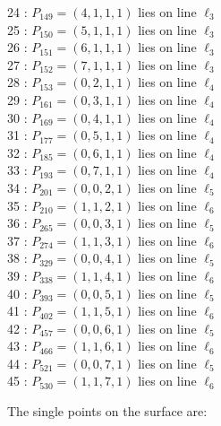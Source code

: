 \documentclass{article}
\begin{document}
{\begin{multicols}{2}
24 : $P_{149}=( 4, 1, 1, 1 )$ lies on line $\ell_{3}$\\
25 : $P_{150}=( 5, 1, 1, 1 )$ lies on line $\ell_{3}$\\
26 : $P_{151}=( 6, 1, 1, 1 )$ lies on line $\ell_{3}$\\
27 : $P_{152}=( 7, 1, 1, 1 )$ lies on line $\ell_{3}$\\
28 : $P_{153}=( 0, 2, 1, 1 )$ lies on line $\ell_{4}$\\
29 : $P_{161}=( 0, 3, 1, 1 )$ lies on line $\ell_{4}$\\
30 : $P_{169}=( 0, 4, 1, 1 )$ lies on line $\ell_{4}$\\
31 : $P_{177}=( 0, 5, 1, 1 )$ lies on line $\ell_{4}$\\
32 : $P_{185}=( 0, 6, 1, 1 )$ lies on line $\ell_{4}$\\
33 : $P_{193}=( 0, 7, 1, 1 )$ lies on line $\ell_{4}$\\
34 : $P_{201}=( 0, 0, 2, 1 )$ lies on line $\ell_{5}$\\
35 : $P_{210}=( 1, 1, 2, 1 )$ lies on line $\ell_{6}$\\
36 : $P_{265}=( 0, 0, 3, 1 )$ lies on line $\ell_{5}$\\
37 : $P_{274}=( 1, 1, 3, 1 )$ lies on line $\ell_{6}$\\
38 : $P_{329}=( 0, 0, 4, 1 )$ lies on line $\ell_{5}$\\
39 : $P_{338}=( 1, 1, 4, 1 )$ lies on line $\ell_{6}$\\
40 : $P_{393}=( 0, 0, 5, 1 )$ lies on line $\ell_{5}$\\
41 : $P_{402}=( 1, 1, 5, 1 )$ lies on line $\ell_{6}$\\
42 : $P_{457}=( 0, 0, 6, 1 )$ lies on line $\ell_{5}$\\
43 : $P_{466}=( 1, 1, 6, 1 )$ lies on line $\ell_{6}$\\
44 : $P_{521}=( 0, 0, 7, 1 )$ lies on line $\ell_{5}$\\
45 : $P_{530}=( 1, 1, 7, 1 )$ lies on line $\ell_{6}$\\
\end{multicols}
The single points on the surface are:\\
}
\end{document}
